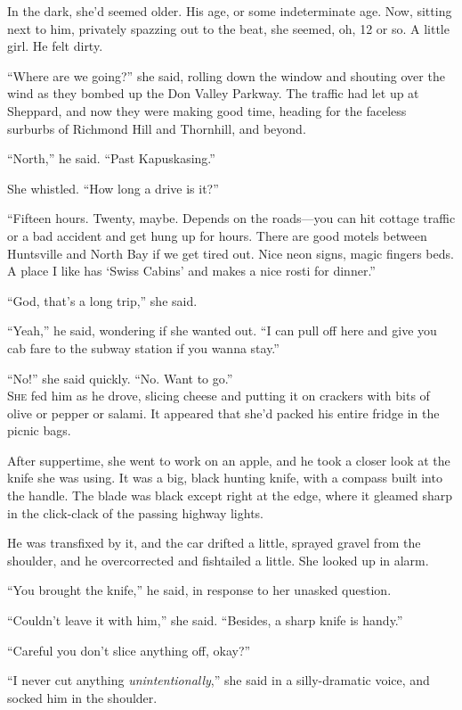 \documentclass{article}
\begin{document}
In the dark, she'd seemed older.  His age, or some indeterminate age. 
Now, sitting next to him, privately spazzing out to the beat, she
seemed, oh, 12 or so.  A little girl.  He felt dirty.

``Where are we going?'' she said, rolling down the window and shouting
over the wind as they bombed up the Don Valley Parkway.  The traffic
had let up at Sheppard, and now they were making good time, heading
for the faceless surburbs of Richmond Hill and Thornhill, and beyond.

``North,'' he said.  ``Past Kapuskasing.''

She whistled.  ``How long a drive is it?''

``Fifteen hours.  Twenty, maybe.  Depends on the roads---you can hit
cottage traffic or a bad accident and get hung up for hours.  There
are good motels between Huntsville and North Bay if we get tired out. 
Nice neon signs, magic fingers beds.  A place I like has `Swiss
Cabins' and makes a nice rosti for dinner.''

``God, that's a long trip,'' she said.

``Yeah,'' he said, wondering if she wanted out.  ``I can pull off here
and give you cab fare to the subway station if you wanna stay.''

``No!'' she said quickly.  ``No.  Want to go.''
\\
\lettrine[lines=3, lhang=.5, nindent=0pt, findent=2pt]{S}{he} fed him as he drove, slicing cheese and putting it on crackers
with bits of olive or pepper or salami.  It appeared that she'd packed
his entire fridge in the picnic bags.

After suppertime, she went to work on an apple, and he took a closer
look at the knife she was using.  It was a big, black hunting knife,
with a compass built into the handle.  The blade was black except
right at the edge, where it gleamed sharp in the click-clack of the
passing highway lights.

He was transfixed by it, and the car drifted a little, sprayed gravel
from the shoulder, and he overcorrected and fishtailed a little.  She
looked up in alarm.

``You brought the knife,'' he said, in response to her unasked
question.

``Couldn't leave it with him,'' she said.  ``Besides, a sharp knife is
handy.''

``Careful you don't slice anything off, okay?''

``I never cut anything \textit{unintentionally},'' she said in a
silly-dramatic voice, and socked him in the shoulder.
\end{document}
